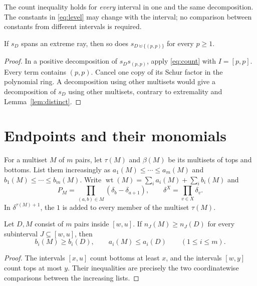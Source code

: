 \documentclass[11pt]{amsart}
\newcommand{\wt}{\operatorname{wt}}
\newcommand{\tops}{\tau}
\newcommand{\bots}{\beta}
\newcommand{\un}{\uplus}
\begin{document}
The count inequality holds for \emph{every} interval in one and the same
decomposition. The constants in \eqref{eq:level} may change with the
interval; no comparison between constants from different intervals is
required.

\begin{corollary}\label{cor:rectangle}
If $s_D$ spans an extreme ray, then so does $s_{D\un\{(p,p)\}}$
for every $p\ge1$.
\end{corollary}
\begin{proof}
In a positive decomposition of $s_Ds_{(p,p)}$, apply
\eqref{eq:count} with $I=[p,p]$. Every term contains $(p,p)$.
Cancel one copy of its Schur factor in the polynomial ring.
A decomposition using other multisets would give a decomposition of
$s_D$ using other multisets, contrary to extremality and
Lemma~\ref{lem:distinct}.
\end{proof}

\section{Endpoints and their monomials}

For a multiset $M$ of $m$ pairs, let $\tops(M)$ and $\bots(M)$ be its
multisets of tops and bottoms. List them increasingly as
$a_1(M)\le\cdots\le a_m(M)$ and $b_1(M)\le\cdots\le b_m(M)$.
Write $\wt(M)=\sum_i a_i(M)+\sum_i b_i(M)$ and
\[
 P_M=\prod_{(a,b)\in M}(\delta_b-\delta_{a+1}),
 \qquad \delta^X=\prod_{v\in X}\delta_v.
\]
In $\delta^{\tops(M)+1}$, the $1$ is added to every member of the
multiset $\tops(M)$.

\begin{lemma}\label{lem:endpoints}
Let $D,M$ consist of $m$ pairs inside $[w,u]$. If
$n_J(M)\ge n_J(D)$ for every subinterval $J\subseteq[w,u]$, then
\begin{equation}\label{eq:endpoints}
 b_i(M)\ge b_i(D),\qquad a_i(M)\le a_i(D)
 \qquad(1\le i\le m).
\end{equation}
\end{lemma}
\begin{proof}
The intervals $[x,u]$ count bottoms at least $x$, and the intervals
$[w,y]$ count tops at most $y$. Their inequalities are precisely the two
coordinatewise comparisons between the increasing lists.
\end{proof}
\end{document}
